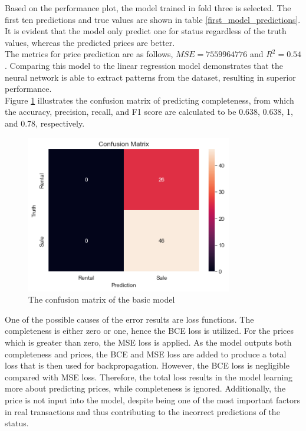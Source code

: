 \documentclass[12pt,twoside]{report}
\begin{document}
Based on the performance plot, the model trained in fold three is selected. The first ten predictions and true values are shown in table \ref{first_model_predictions}. It is evident that the model only predict one for status regardless of the truth values, whereas the predicted prices are better.  
\\

The metrics for price prediction are as follows, $MSE = 7559964776$ and $R^2 = 0.54$. Comparing this model to the linear regression model demonstrates that the neural network is able to extract patterns from the dataset, resulting in superior performance. 
\\

Figure \ref{confusion_matrix_basic_model} illustrates the confusion matrix of predicting completeness, from which the accuracy, precision, recall, and F1 score are calculated to be 0.638, 0.638, 1, and 0.78, respectively. 
\\

\begin{figure}[!htbp]
	\centering
	\includegraphics[width=9cm]{confusion_matrix_basic_model}
	\caption{The confusion matrix of the basic model}
	\label{confusion_matrix_basic_model}
\end{figure}

One of the possible causes of the error results are loss functions. The completeness is either zero or one, hence the BCE loss is utilized. For the prices which is greater than zero, the MSE loss is applied. As the model outputs both completeness and prices, the BCE and MSE loss are added to produce a total loss that is then used for backpropagation. However, the BCE loss is negligible compared with MSE loss. Therefore, the total loss results in the model learning more about predicting prices, while completeness is ignored. Additionally, the price is not input into the model, despite being one of the most important factors in real transactions and thus contributing to the incorrect predictions of the status.
\end{document}

